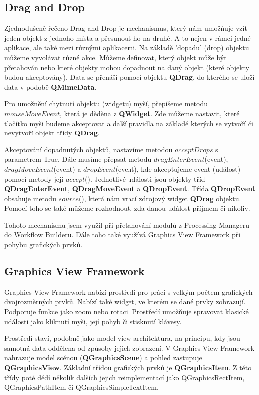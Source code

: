 \subsection{Drag and Drop}
Zjednodušeně řečeno Drag and Drop je mechanismus, který nám umožňuje vzít jeden objekt z jednoho místa a přesunout ho na druhé. A to nejen v rámci jedné aplikace, ale také mezi různými aplikacemi. Na základě 'dopadu' (drop) objektu můžeme vyvolávat různé akce. Můžeme definovat, který objekt může být přetahován nebo které objekty mohou dopadnout na daný objekt (které objekty budou akceptovány). Data se přenáší pomocí objektu \textbf{QDrag}, do kterého se uloží data v podobě \textbf{QMimeData}.

Pro umožnění chytnutí objektu (widgetu) myší, přepíšeme metodu $mouseMoveEvent$, která je děděna z \textbf{QWidget}. Zde můžeme nastavit, které tlačítko myši budeme akceptovat a další pravidla na základě kterých se vytvoří či nevytvoří objekt třídy \textbf{QDrag}. 

Akceptování dopadnutých objektů, nastavíme metodou $acceptDrops$ s parametrem True. Dále musíme přepsat metodu $dragEnterEvent$(event), $dragMoveEvent$(event) a $dropEvent$(event), kde akceptujeme event (událost) pomocí metody její $accept$(). Jednotlivé události jsou objekty tříd \textbf{QDragEnterEvent}, \textbf{QDragMoveEvent} a \textbf{QDropEvent}. Třída \textbf{QDropEvent} obsahuje metodu $source$(), která nám vrací zdrojový widget \textbf{QDrag} objektu. Pomocí toho se také můžeme rozhodnout, zda danou událost příjmem či nikoliv.

Tohoto mechanismu jsem využil při přetahování modulů z Processing Manageru do Workflow Builderu. Dále toho také využívá Graphics View Framework při pohybu grafických prvků.

\subsection{Graphics View Framework}
Graphics View Framework nabízí prostředí pro práci s velkým počtem grafických dvojrozměrných prvků. Nabízí také widget, ve kterém se dané prvky zobrazují. Podporuje funkce jako zoom nebo rotaci. Prostředí umožňuje spravovat klasické události jako kliknutí myši, její pohyb či stisknutí klávesy. 

Prostředí staví, podobně jako model-view architektura, na principu, kdy jsou samotná data oddělena od způsoby jejich zobrazení. V Graphics View Framework nahrazuje model scénou (\textbf{QGraphicsScene}) a pohled zastupuje \textbf{QGraphicsView}. Základní třídou grafických prvků je \textbf{QGraphicsItem}. Z této třídy poté dědí několik dalších jejich reimplementací jako QGraphicsRectItem, QGraphicsPathItem či QGraphicsSimpleTextItem. 

